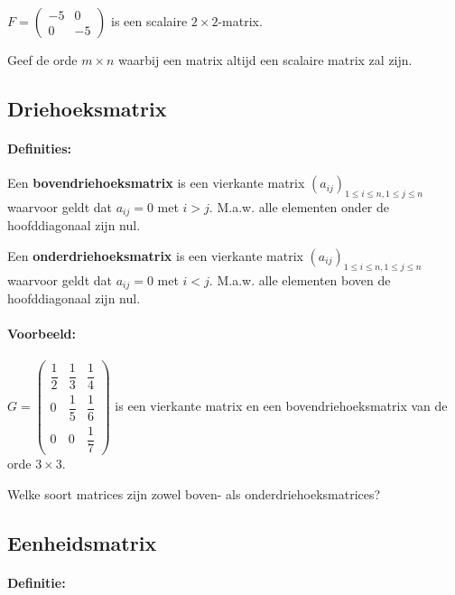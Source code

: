 \documentclass[12pt,twoside]{article}
\begin{document}
$F=
\begin{pmatrix}
  -5 & 0 \\ 0 & -5
\end{pmatrix}
$ is een scalaire $2 \times 2$-matrix.

\begin{oefening}
  Geef de orde $m \times n$ waarbij een matrix altijd een scalaire matrix zal zijn.
\end{oefening}

\subsection{Driehoeksmatrix}

\paragraph*{Definities:}\mbox{}

Een {\bf bovendriehoeksmatrix} is een vierkante matrix $(a_{ij})_{1 \leq i \leq n , 1 \leq j \leq n}$ waarvoor geldt dat $a_{ij}=0$ met $i > j$. M.a.w. alle elementen onder de hoofddiagonaal zijn nul.

Een {\bf onderdriehoeksmatrix} is een vierkante matrix $(a_{ij})_{1 \leq i \leq n , 1 \leq j \leq n}$ waarvoor geldt dat $a_{ij}=0$ met $i < j$. M.a.w. alle elementen boven de hoofddiagonaal zijn nul.

\paragraph*{Voorbeeld:}

$G=
\begin{pmatrix}
  \dfrac{1}{2} & \dfrac{1}{3} & \dfrac{1}{4} \\
  0            & \dfrac{1}{5} & \dfrac{1}{6} \\
  0            & 0            & \dfrac{1}{7}
\end{pmatrix}
$ is een vierkante matrix en een bovendriehoeksmatrix van de orde $3 \times 3$.


\begin{oefening}
Welke soort matrices zijn zowel boven- als onderdriehoeksmatrices?
\end{oefening}

\subsection{Eenheidsmatrix}

\paragraph*{Definitie:}
\end{document}
